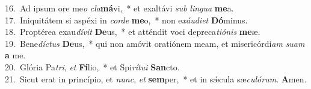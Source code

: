 {16.~}Ad ipsum ore me\textit{o} \textit{cla}\textbf{má}vi,~* et exaltávi \textit{sub} \textit{lin}\textit{gua} \textbf{me}a.\\
{17.~}Iniquitátem si aspéxi in \textit{cor}\textit{de} \textbf{me}o,~* non e\textit{xáu}\textit{di}\textit{et} \textbf{Dó}minus.\\
{18.~}Proptérea exau\textit{dí}\textit{vit} \textbf{De}us,~* et atténdit voci depreca\textit{ti}\textit{ó}\textit{nis} \textbf{me}æ.\\
{19.~}Bene\textit{dí}\textit{ctus} \textbf{De}us,~* qui non amóvit oratiónem meam, et misericórdi\textit{am} \textit{su}\textit{am} \textbf{a} me.\\
{20.~}Glória Pa\textit{tri}, \textit{et} \textbf{Fí}lio,~* et Spi\textit{rí}\textit{tu}\textit{i} \textbf{San}cto.\\
{21.~}Sicut erat in princípio, et \textit{nunc}, \textit{et} \textbf{sem}per,~* et in sǽcula sæ\textit{cu}\textit{ló}\textit{rum}. \textbf{A}men.\\
